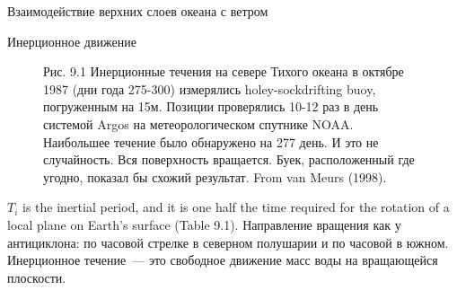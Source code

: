 \begin{chapter}{Взаимодействие верхних слоев океана с ветром}
\begin{section}{Инерционное движение}
\begin{figure}[t]
\caption{Рис. 9.1 Инерционные течения на севере Тихого океана в
октябре 1987 (дни года 275-300) измерялись holey-sockdrifting buoy,
погруженным на 15м. Позиции проверялись 10-12 раз в день системой
Argos на метеорологическом спутнике NOAA. Наибольшее течение было
обнаружено на 277 день. И это не случайность. Вся поверхность
вращается. Буек, расположенный где угодно, показал бы схожий
результат. From van Meurs (1998).}
\label{fig:inertialcur}
\end{figure}
%


$T_i$ is the inertial period, and it is one half the time required for
the rotation of a local plane on Earth's surface (Table 9.1). 
Направление вращения как у антициклона: по часовой стрелке в
северном полушарии и по часовой в южном. Инерционное течение~--- это
свободное движение масс воды на вращающейся плоскости.
%


\end{section}
\end{chapter}
